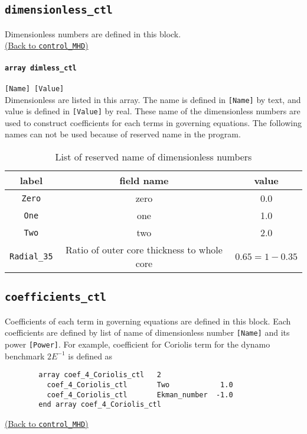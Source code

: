 \subsection{\tt dimensionless\_ctl}
\label{href_t:dimensionless_ctl}
Dimensionless numbers are defined in this block. \\
\hyperref[href_i:dimensionless_ctl]{(Back to {\tt control\_MHD})}

\paragraph{\tt array dimless\_ctl}
\label{href_t:dimless_ctl}
\verb|[Name] [Value]| \\
Dimensionless are listed in this array. The name is defined in \verb|[Name]| by text, and value is defined in \verb|[Value]| by real. These name of the dimensionless numbers are used to construct coefficients for each terms in governing equations. The following names can not be used because of reserved name in the program.
%
\begin{table}[htdp]
\caption{List of reserved name of dimensionless numbers}
\begin{center}
\begin{tabular}{|c|c|c|}
\hline
 label & field name & value \\ \hline
\verb|Zero| & zero & 0.0 \\
\verb|One| &  one &  1.0 \\
\verb|Two| &  two &  2.0 \\
\verb|Radial_35| & Ratio of outer core thickness to whole core & $0.65 = 1 - 0.35$ \\ \hline
\end{tabular}
\end{center}
\label{table:reserved_params}
\end{table}
%

\subsection{\tt coefficients\_ctl}
\label{href_t:coefficients_ctl}
Coefficients of each term in governing equations are defined in this block.
Each coefficients are defined by list of name of dimensionless number \verb|[Name]| and its power \verb|[Power]|. For example, coefficient for Coriolis term for the dynamo benchmark $ 2E^{-1}$ is defined as
%
\begin{verbatim}
        array coef_4_Coriolis_ctl   2
          coef_4_Coriolis_ctl       Two            1.0
          coef_4_Coriolis_ctl       Ekman_number  -1.0
        end array coef_4_Coriolis_ctl
\end{verbatim}
%
\hyperref[href_i:coefficients_ctl]{(Back to {\tt control\_MHD})}

